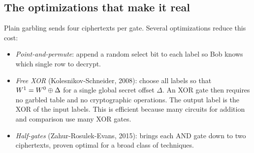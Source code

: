 \subsection{The optimizations that make it real}

Plain garbling sends four ciphertexts per gate. Several optimizations reduce this cost:

\begin{itemize}
  \item \emph{Point-and-permute}: append a random select bit to each label so Bob knows which single row to decrypt.
  \item \emph{Free XOR} (Kolesnikov-Schneider, 2008): choose all labels so that $W^1 = W^0 \oplus \Delta$ for a single global secret offset $\Delta$. An XOR gate then requires no garbled table and no cryptographic operations. The output label is the XOR of the input labels. This is efficient because many circuits for addition and comparison use many XOR gates.
  \item \emph{Half-gates} (Zahur-Rosulek-Evans, 2015): brings each AND gate down to two ciphertexts, proven optimal for a broad class of techniques.
\end{itemize}


